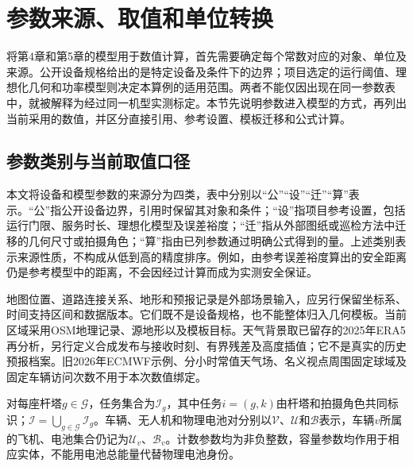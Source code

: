 \section{参数来源、取值和单位转换}
\label{sec:06_01}

将第4章和第5章的模型用于数值计算，首先需要确定每个常数对应的对象、单位及来源。公开设备规格给出的是特定设备及条件下的边界；项目选定的运行阈值、理想化几何和功率模型则决定本算例的适用范围。两者不能仅因出现在同一参数表中，就被解释为经过同一机型实测标定。本节先说明参数进入模型的方式，再列出当前采用的数值，并区分直接引用、参考设置、模板迁移和公式计算。

\subsection{参数类别与当前取值口径}

本文将设备和模型参数的来源分为四类，表中分别以“公”“设”“迁”“算”表示。“公”指公开设备边界，引用时保留其对象和条件；“设”指项目参考设置，包括运行门限、服务时长、理想化模型及误差裕度；“迁”指从外部图纸或巡检方法中迁移的几何尺寸或拍摄角色；“算”指由已列参数通过明确公式得到的量。上述类别表示来源性质，不构成从低到高的精度排序。例如，由参考误差裕度算出的安全距离仍是参考模型中的距离，不会因经过计算而成为实测安全保证。

地图位置、道路连接关系、地形和预报记录是外部场景输入，应另行保留坐标系、时间支持区间和数据版本。它们既不是设备规格，也不能整体归入几何模板。当前区域采用OSM地理记录、源地形以及模板目标。天气背景取已留存的2025年ERA5再分析，另行定义合成发布与接收时刻、有界残差及高度插值；它不是真实的历史预报档案。旧2026年ECMWF示例、分小时常值天气场、名义视点周围固定球域及固定车辆访问次数不用于本次数值绑定。

对每座杆塔$g\in\mathcal G$，任务集合为$\mathcal I_g$，其中任务$i=(g,k)$由杆塔和拍摄角色共同标识；$\mathcal I=\bigcup_{g\in\mathcal G}\mathcal I_g$。车辆、无人机和物理电池对分别以$\mathcal V$、$\mathcal U$和$\mathcal B$表示，车辆$v$所属的飞机、电池集合仍记为$\mathcal U_v$、$\mathcal B_v$。计数参数均为非负整数，容量参数均作用于相应实体，不能用电池总能量代替物理电池身份。

